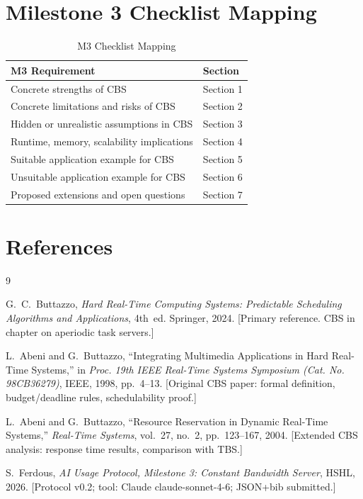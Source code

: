 \documentclass[conference]{IEEEtran}
\begin{document}
\section{Milestone 3 Checklist Mapping}

\begin{table}[h]
\centering
\caption{M3 Checklist Mapping}
\renewcommand{\arraystretch}{1.3}
\begin{tabular}{|p{5.5cm}|p{2.0cm}|}
\hline
\textbf{M3 Requirement} & \textbf{Section} \\
\hline
Concrete strengths of CBS & Section 1 \\
\hline
Concrete limitations and risks of CBS & Section 2 \\
\hline
Hidden or unrealistic assumptions in CBS & Section 3 \\
\hline
Runtime, memory, scalability implications & Section 4 \\
\hline
Suitable application example for CBS & Section 5 \\
\hline
Unsuitable application example for CBS & Section 6 \\
\hline
Proposed extensions and open questions & Section 7 \\
\hline
\end{tabular}
\end{table}

\section*{References}

\begin{thebibliography}{9}

G.~C.~Buttazzo,
\textit{Hard Real-Time Computing Systems: Predictable Scheduling
Algorithms and Applications}, 4th~ed.
Springer, 2024.
[Primary reference. CBS in chapter on aperiodic task servers.]

L.~Abeni and G.~Buttazzo,
``Integrating Multimedia Applications in Hard Real-Time Systems,''
in \textit{Proc. 19th IEEE Real-Time Systems Symposium
(Cat. No. 98CB36279)}, IEEE, 1998, pp.~4--13.
[Original CBS paper: formal definition, budget/deadline rules,
schedulability proof.]

L.~Abeni and G.~Buttazzo,
``Resource Reservation in Dynamic Real-Time Systems,''
\textit{Real-Time Systems}, vol.~27, no.~2, pp.~123--167, 2004.
[Extended CBS analysis: response time results, comparison with TBS.]

S.~Ferdous,
\textit{AI Usage Protocol, Milestone 3: Constant Bandwidth Server},
HSHL, 2026.
[Protocol v0.2; tool: Claude claude-sonnet-4-6; JSON+bib submitted.]

\end{thebibliography}
\end{document}
